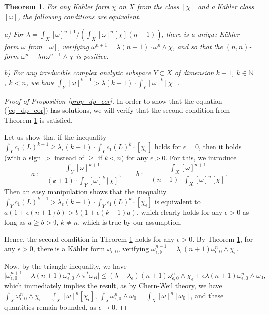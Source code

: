 \documentclass[12pt]{article}
\numberwithin{equation}{section}
\theoremstyle{theorem}
\newtheorem{thm}{Theorem}[section]
\theoremstyle{definition}
\theoremstyle{remark}
\newcommand{\nat}{\mathbb{N}}
\begin{document}
	\begin{thm}\label{thm_datar_ping}
		For any Kähler form $\chi$ on $X$ from the class $[\chi]$ and a Kähler class $[\omega]$, the following conditions are equivalent.
		\par 
		a) For $\lambda = \int_X [\omega]^{n + 1} / (\int_X [\omega]^n [\chi] (n + 1))$, there is a unique Kähler form $\omega$ from $[\omega]$, verifying $\omega^{n + 1} = \lambda (n + 1) \cdot \omega^n \wedge \chi$, and so that the $(n, n)$-form $\omega^n - \lambda n \omega^{n - 1} \wedge \chi$ is positive.
		\par 
		b) 	For any irreducible complex analytic subspace $Y \subset X$ of dimension $k + 1$, $k \in \nat$, $k < n$, we have 
	$\int_Y [\omega]^{k + 1} > \lambda (k + 1) \cdot \int_Y [\omega]^k [\chi]$.
	\end{thm}
	\begin{proof}[Proof of Proposition \ref{prop_dp_cor}]
		In order to show that the equation (\ref{eq_dp_cor}) has solutions, we will verify that the second condition from Theorem \ref{thm_datar_ping} is satisfied. 
		\par
		Let us show that if the inequality $\int_Y c_1(L)^{k + 1} \geq \lambda_{\epsilon} (k + 1) \cdot \int_Y c_1(L)^k \cdot [\chi_{\epsilon}]$ holds for $\epsilon = 0$, then it holds (with a sign $>$ instead of $\geq$ if $k < n$) for any $\epsilon > 0$.
		For this, we introduce
		\begin{equation}\label{eq_a_b_calc_num_cr}
			a := \frac{\int_Y [\omega]^{k + 1}}{(k + 1) \cdot \int_Y [\omega]^k [\chi]},
			\qquad
			b := \frac{\int_X [\omega]^{n + 1}}{(n + 1) \cdot \int_X [\omega]^n [\chi]}.
		\end{equation}
		Then an easy manipulation shows that the inequality $\int_Y c_1(L)^{k + 1} > \lambda_{\epsilon} (k + 1) \cdot \int_Y c_1(L)^k \cdot [\chi_{\epsilon}]$ is equivalent to $a (1 + \epsilon (n + 1) b) > b (1 + \epsilon (k + 1) a)$, which clearly holds for any $\epsilon > 0$ as long as $a \geq b > 0$, $k \neq n$, which is true by our assumption.
		\par 
		Hence, the second condition in Theorem \ref{thm_datar_ping} holds for any $\epsilon > 0$.
		By Theorem \ref{thm_datar_ping}, for any $\epsilon > 0$, there is a Kähler form $\omega_{\epsilon, 0}$, verifying $\omega_{\epsilon, 0}^{n + 1} = \lambda_{\epsilon} (n + 1) \omega_{\epsilon, 0}^n \wedge \chi_{\epsilon}$.
		\par 
		Now, by the triangle inequality, we have
		\begin{equation}
			\big| \omega_{\epsilon, 0}^{n + 1} - \lambda (n + 1) \omega_{\epsilon, 0}^n \wedge \pi^* \omega_B \big|
			\leq
			 (\lambda - \lambda_{\epsilon}) (n + 1) \omega_{\epsilon, 0}^n \wedge \chi_{\epsilon}
			+
			\epsilon \lambda (n + 1) \omega_{\epsilon, 0}^n \wedge \omega_0,
		\end{equation}
		which immediately implies the result, as by Chern-Weil theory, we have $\int_X \omega_{\epsilon, 0}^n \wedge \chi_{\epsilon} = \int_X [\omega]^n [\chi_{\epsilon}]$, $\int_X \omega_{\epsilon, 0}^n \wedge \omega_0 = \int_X [\omega]^n [\omega_0]$, and these quantities remain bounded, as $\epsilon \to 0$.
	\end{proof}
\end{document}
